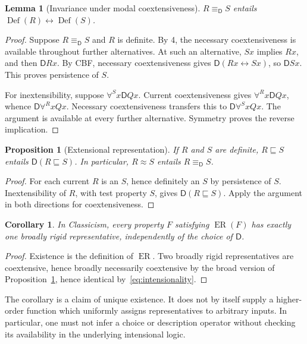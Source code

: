\documentclass[11pt]{article}
\newtheorem{proposition}[theorem]{Proposition}
\newtheorem{lemma}[theorem]{Lemma}
\newtheorem{corollary}[theorem]{Corollary}
\theoremstyle{definition}
\newcommand{\D}{\mathsf D}
\newcommand{\Def}{\operatorname{Def}}
\newcommand{\ER}{\operatorname{ER}}
\newcommand{\rel}{\mathbin{\approx}}
\newcommand{\deq}{\mathbin{\equiv_{\D}}}
\newcommand{\sub}{\mathbin{\sqsubseteq}}
\numberwithin{equation}{section}
\begin{document}
\begin{lemma}[Invariance under modal coextensiveness]\label{lem:invariance}
$R\deq S$ entails $\Def(R)\leftrightarrow\Def(S)$.
\end{lemma}
\begin{proof}
Suppose $R\deq S$ and $R$ is definite. By 4, the necessary coextensiveness is available throughout further alternatives. At such an alternative, $Sx$ implies $Rx$, and then $\D Rx$. By CBF, necessary coextensiveness gives $\D(Rx\leftrightarrow Sx)$, so $\D Sx$. This proves persistence of $S$.

For inextensibility, suppose $\forall^S x\D Qx$. Current coextensiveness gives $\forall^R x\D Qx$, whence $\D\forall^R xQx$. Necessary coextensiveness transfers this to $\D\forall^S xQx$. The argument is available at every further alternative. Symmetry proves the reverse implication.
\end{proof}

\begin{proposition}[Extensional representation]\label{prop:representation}
If $R$ and $S$ are definite, $R\sub S$ entails $\D(R\sub S)$. In particular, $R\rel S$ entails $R\deq S$.
\end{proposition}
\begin{proof}
For each current $R$ is an $S$, hence definitely an $S$ by persistence of $S$. Inextensibility of $R$, with test property $S$, gives $\D(R\sub S)$. Apply the argument in both directions for coextensiveness.
\end{proof}

\begin{corollary}\label{cor:unique}
In Classicism, every property $F$ satisfying $\ER(F)$ has exactly one broadly rigid representative, independently of the choice of $\D $.
\end{corollary}
\begin{proof}
Existence is the definition of $\ER$. Two broadly rigid representatives are coextensive, hence broadly necessarily coextensive by the broad version of Proposition~\ref{prop:representation}, hence identical by~\eqref{eq:intensionality}.
\end{proof}

The corollary is a claim of unique existence. It does not by itself supply a higher-order function which uniformly assigns representatives to arbitrary inputs. In particular, one must not infer a choice or description operator without checking its availability in the underlying intensional logic.
\end{document}
